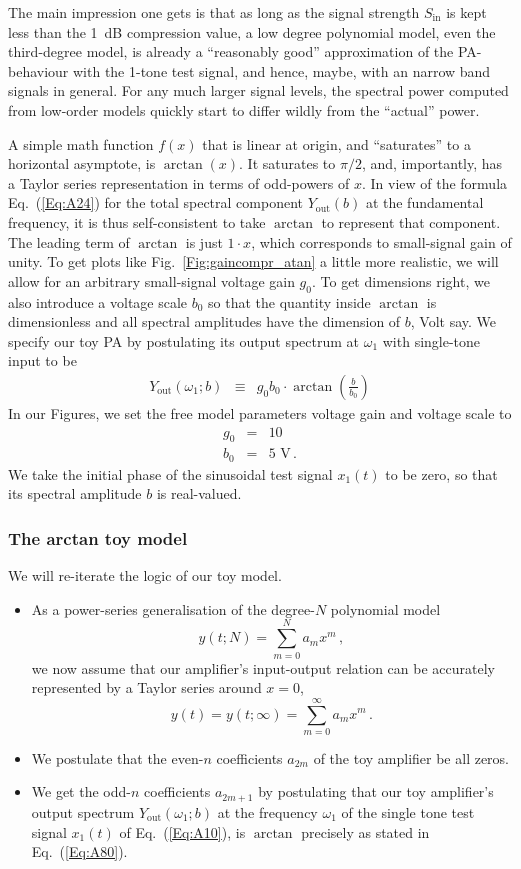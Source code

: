 \documentclass[11pt,oneside,a4paper]{scrartcl}
\newcommand{\EQ}[1]{\begin{equation}\label{Eq:#1}}
\newcommand{\EE}{\end{equation}}
\newcommand{\Eq}[1]{Eq.~(\ref{Eq:#1})}
\newcommand{\Fig}[1]{Fig.~\ref{Fig:#1}}
\newcommand { \mr }[1] {\ensuremath {\mathrm{#1}}}
\begin{document}
The main impression one gets is that as long as the signal strength $S_\mr{in}$ is kept less than the 1~dB compression value, a low degree polynomial model, even the third-degree model, is already a ``reasonably good'' approximation of the PA-behaviour with the 1-tone test signal, and hence, maybe, with an narrow band signals in general. For any much larger signal levels, the spectral power computed from low-order models quickly start to differ wildly from the ``actual'' power. 

A simple math function $f(x)$ that is linear at origin, and ``saturates'' to a horizontal asymptote, is $\arctan(x)$. It saturates to $\pi/2$, and, importantly, has a Taylor series representation in terms of odd-powers of $x$. In view of the formula \Eq{A24} for the total spectral component $Y_\mr{out}(b)$ at the fundamental frequency, it is thus self-consistent to take $\arctan$ to represent that component. The leading term of $\arctan$ is just $1\cdot x$, which corresponds to small-signal gain of unity. To get  plots like \Fig{gaincompr_atan} a little more realistic, we will allow for an arbitrary small-signal voltage gain $g_0$. To get dimensions right, we also introduce a voltage scale $b_0$ so that the quantity inside $\arctan$ is dimensionless and all spectral amplitudes have the dimension of $b$, Volt say. We specify our toy PA  by postulating its output spectrum at $\omega_1$ with single-tone input to be
\begin{eqnarray}
	Y_\mr{out}(\omega_1;b) 
		&\equiv& 
			g_0 b_0 \cdot \arctan(\frac{b}{b_0})	\label{Eq:A80}
\end{eqnarray}
In our Figures, we set the free model parameters voltage gain and voltage scale to
\begin{eqnarray}
	g_0 &=& 10 \label{Eq:A78} \\
	b_0 &=& 5 \mbox{ V} \label{Eq:A79}	\,.
\end{eqnarray}
We take the initial phase of the sinusoidal test signal $x_1(t)$ to be zero, so that its spectral amplitude $b$ is real-valued. 

\subsubsection*{The arctan toy model}
%
We will re-iterate the logic of our toy model. 
\begin{itemize}
\item
As a power-series generalisation of the degree-$N$ polynomial model
\EQ{A90a}
	y(t;N) = \sum_{m=0}^{N} a_{m} x^{m}	\,,
\EE
we now assume that our amplifier's input-output relation can be accurately represented by a Taylor series around $x=0$, 
\EQ{A90}
	y(t) = y(t;\infty) 
			= \sum_{m=0}^{\infty} a_{m} x^{m}	\,.
\EE
\item
We postulate that the even-$n$ coefficients $a_{2m}$ of the toy amplifier be all zeros. 
\item
We get the odd-$n$ coefficients $a_{2m+1}$ by postulating that our toy amplifier's output spectrum 
$Y_\mr{out}(\omega_1;b)$
at the frequency $\omega_1$ of the single tone test signal $x_1(t)$ of \Eq{A10}, is $\arctan$ precisely as stated in \Eq{A80}.
\end{itemize}
\end{document}
